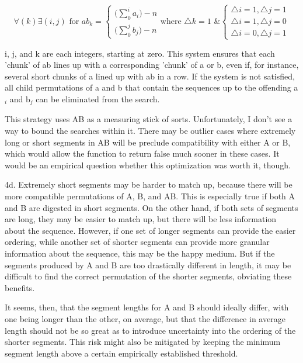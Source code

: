 \documentclass[12pt]{amsart}
\begin{document}
\begin{displaymath}
\forall (k) \exists (i, j) \text{ for } ab_k = \begin{cases}\big( \sum_0^i a_i\big) - n \\ \big(\sum_0^j b_j\big) -n
 \end{cases} 
\text{where } \triangle k = 1 \text{ \&} \begin{cases}\triangle i = 1, \triangle j = 1 \\ \triangle i = 1, \triangle j =0 \\ \triangle i = 0, \triangle j =1\end {cases}
\end{displaymath}


i, j, and k are each integers, starting at zero. This system ensures that each 'chunk' of ab lines up with a corresponding 'chunk' of a or b, even if, for instance, several short chunks of a lined up with ab in a row.  If the system is not satisfied, all child permutations of a and b that contain the sequences up to the offending a$_i$ and b$_j$ can be eliminated from the search.

This strategy uses AB as a measuring stick of sorts.  Unfortunately, I don't see a way to bound the searches within it.  There may be outlier cases where extremely long or short segments in AB will be preclude compatibility with either A or B, which would allow the function to return false much sooner in these cases.  It would be an empirical question whether this optimization was worth it, though.

\pagebreak[4]
4d.  Extremely short segments may be harder to match up, because there will be more compatible permutations of A, B, and AB.  This is especially true if both A and B are digested in short segments.  On the other hand, if both sets of segments are long, they may be easier to match up, but there will be less information about the sequence.  However, if one set of longer segments can provide the easier ordering, while another set of shorter segments can provide more granular information about the sequence, this may be the happy medium.  But if the segments produced by A and B are too drastically different in length, it may be difficult to find the correct permutation of the shorter segments, obviating these benefits.  

It seems, then, that the segment lengths for A and B should ideally differ, with one being longer than the other, on average, but that the difference in average length should not be so great as to introduce uncertainty into the ordering of the shorter segments.  This risk might also be mitigated by keeping the minimum segment length above a certain empirically established threshold.


 
\end{document}
